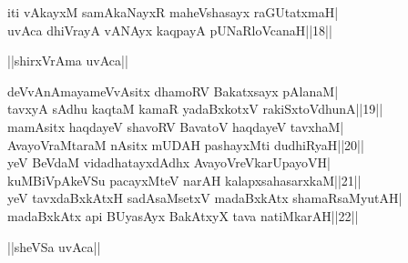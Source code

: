 \documentclass{article}
\begin{document}
iti vAkayxM samAkaNayxR maheVshasayx raGUtatxmaH|\\
uvAca dhiVrayA vANAyx kaqpayA pUNaRloVcanaH||18||\\

\begin{center}
||shirxVrAma uvAca||
\end{center}

deVvAnAmayameVvAsitx dhamoRV Bakatxsayx pAlanaM|\\
tavxyA sAdhu kaqtaM kamaR yadaBxkotxV rakiSxtoVdhunA||19||\\
mamAsitx haqdayeV shavoRV BavatoV haqdayeV tavxhaM|\\
AvayoVraMtaraM nAsitx mUDAH pashayxMti dudhiRyaH||20||\\
yeV BeVdaM vidadhatayxdAdhx AvayoVreVkarUpayoVH|\\
kuMBiVpAkeVSu pacayxMteV narAH kalapxsahasarxkaM||21||\\
yeV tavxdaBxkAtxH sadAsaMsetxV madaBxkAtx shamaRsaMyutAH|\\
madaBxkAtx api BUyasAyx BakAtxyX tava natiMkarAH||22||\\

\begin{center}
||sheVSa uvAca||
\end{center}
\end{document}
